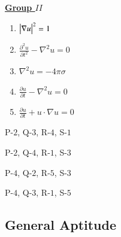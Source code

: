 \documentclass[journal,12pt,onecolumn]{IEEEtran}
\theoremstyle{remark}
\begin{document}
\begin{enumerate}
\begin{multicols}{2}
                \columnbreak
    
                \underline{\textbf{Group $II$}}
                \begin{enumerate}
                    \item $\begin{vmatrix}\nabla u\end{vmatrix}^2 = 1 $
                    \item $\frac{\partial^2u}{\partial t^2} - \nabla^2 u = 0$
                    \item $\nabla^2u = -4\pi\sigma$
                    \item $\frac{\partial u}{\partial t} - \nabla^2u=0$
                    \item $\frac{\partial u}{\partial t} + u\cdot\nabla u = 0 $
                \end{enumerate}
            \end{multicols}
    
            \begin{enumerate}
                \begin{multicols}{2}
                    \item P-$2$, Q-$3$, R-$4$, S-$1$
                    \item P-$2$, Q-$4$, R-$1$, S-$3$
                    \item P-$4$, Q-$2$, R-$5$, S-$3$
                    \item P-$4$, Q-$3$, R-$1$, S-$5$
                \end{multicols}
            \end{enumerate}
    
    \begin{center}
        \section*{General Aptitude}
    \end{center}
    

\end{enumerate}
\end{document}
